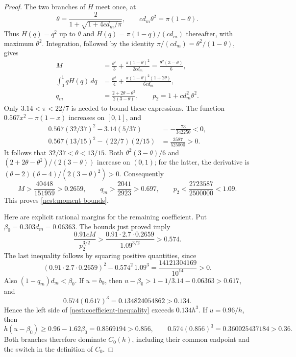 \begin{proof}
The two branches of $H$ meet once, at
\[
 \theta=\frac{2}{1+\sqrt{1+4cd_m/\pi}},
 \qquad cd_m\theta^2=\pi(1-\theta).
\]
Thus $H(q)=q^2$ up to $\theta$ and
$H(q)=\pi(1-q)/(cd_m)$ thereafter, with maximum $\theta^2$.
Integration, followed by the identity
$\pi/(cd_m)=\theta^2/(1-\theta)$, gives
\begin{equation}\label{nest:exact-moments}
 \begin{split}
 M&=\frac{\theta^3}3+
       \frac{\pi(1-\theta)^2}{2cd_m}
     =\frac{\theta^2(3-\theta)}6,\\
 \int_0^1qH(q)\,dq
   &=\frac{\theta^4}4+
       \frac{\pi(1-\theta)^2(1+2\theta)}{6cd_m},\\
 q_m&=\frac{2+2\theta-\theta^2}{2(3-\theta)},\qquad
 p_2=1+cd_m^2\theta^2.
 \end{split}
\end{equation}
Only $3.14<\pi<22/7$ is needed to bound these expressions.
The function $0.567x^2-\pi(1-x)$ increases on $[0,1]$, and
\[
 \begin{split}
 0.567(32/37)^2-3.14(5/37)&=-\frac{73}{342250}<0,\\
 0.567(13/15)^2-(22/7)(2/15)&=\frac{3587}{525000}>0.
 \end{split}
\]
It follows that $32/37<\theta<13/15$.
Both $\theta^2(3-\theta)/6$ and
$(2+2\theta-\theta^2)/(2(3-\theta))$ increase on $(0,1)$;
for the latter, the derivative is
$(\theta-2)(\theta-4)/(2(3-\theta)^2)>0$.
Consequently
\[
 M>\frac{40448}{151959}>0.2659,
 \qquad q_m>\frac{2041}{2923}>0.697,
 \qquad p_2<\frac{2723587}{2500000}<1.09.
\]
This proves \eqref{nest:moment-bounds}.

Here are explicit rational margins for the remaining coefficient.
Put $\beta_0=0.303d_m=0.06363$.  The bounds just proved imply
\[
 \frac{0.91cM}{p_2^{3/2}}
   >\frac{0.91\cdot2.7\cdot0.2659}{1.09^{3/2}}>0.574.
\]
The last inequality follows by squaring positive quantities, since
\[
 (0.91\cdot2.7\cdot0.2659)^2
      -0.574^2\,1.09^3
      =\frac{14121304169}{10^{14}}>0.
\]
Also $(1-q_m)d_m<\beta_0$.
If $u=b_0$, then
$u-\beta_0>1-1/3.14-0.06363>0.617$, and
\[
 0.574(0.617)^3=0.134824054862>0.134.
\]
Hence the left side of \eqref{nest:coefficient-inequality} exceeds
$0.134h^3$.  If $u=0.96/h$, then
\[
 h(u-\beta_0)\geq0.96-1.62\beta_0
     =0.8569194>0.856,
 \qquad
 0.574(0.856)^3=0.360025437184>0.36.
\]
Both branches therefore dominate $C_0(h)$, including their common
endpoint and the switch in the definition of $C_0$.
\end{proof}

